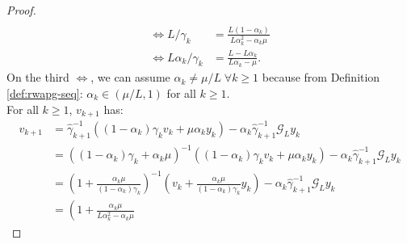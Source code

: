 \documentclass[12pt]{article}
\begin{document}
\begin{proof}
\begin{align*}
                \\
                \iff 
                L/\gamma_k
                &= 
                \frac{L (1 - \alpha_k)}{L \alpha_k^2 - \alpha_k\mu}
                \\
                \iff 
                L\alpha_k/\gamma_k
                &= 
                \frac{L - L\alpha_k}{L\alpha_k - \mu}. 
            \end{align*}
            On the third $\iff$, we can assume $\alpha_k \neq \mu/L\;  \forall k \ge 1$ because from Definition \ref{def:rwapg-seq}: $\alpha_k \in (\mu/L, 1)$ for all $k \ge 1$. 
            \\
            For all $k \ge 1$, $v_{k + 1}$ has: 
            \begin{align*}
                v_{k + 1} &= 
                \hat \gamma_{k + 1}^{-1}
                ((1 - \alpha_k)\gamma_k v_k + \mu\alpha_k y_k)
                - \alpha_k\hat \gamma_{k + 1}^{-1}\mathcal G_L y_k
                \\
                &= 
                ((1 - \alpha_k)\gamma_k + \alpha_k \mu)^{-1}
                \left(
                    (1 - \alpha_k)\gamma_k v_k + \mu\alpha_k y_k
                \right)
                - \alpha_k\hat \gamma_{k + 1}^{-1}\mathcal G_L y_k
                \\
                &= 
                \left(
                    1 + \frac{\alpha_k\mu}{(1 - \alpha_k)\gamma_k}
                \right)^{-1}
                \left(
                    v_k + 
                    \frac{\alpha_k\mu}{(1 - \alpha_k)\gamma_k} y_k
                \right)
                - \alpha_k\hat \gamma_{k + 1}^{-1}\mathcal G_L y_k
                \\
                &= 
                \left(
                    1 + \frac{\alpha_k \mu}{L \alpha_k^2 - \alpha_k \mu}

\end{align*}
\end{proof}
\end{document}
